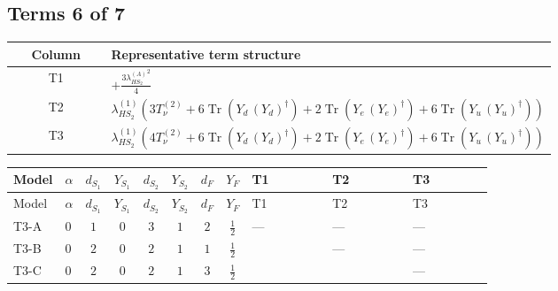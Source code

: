 \documentclass[8pt]{article}
\begin{document}
\begin{landscape}
\subsection*{Terms 6 of 7}
\begin{center}
\begin{tabular}{@{}c >{\raggedright\arraybackslash}p{0.82\linewidth}@{}}
\toprule
Column & Representative term structure \\
\midrule
T1 & \(\displaystyle +\frac{3 {\lambda_{HS_2}^{(A)}}^2}{4}\) \\
\midrule
T2 & \(\displaystyle {\lambda_{HS_2}^{(1)}} (3 T_{\nu}^{(2)}+6 \operatorname{Tr}\!\left({Y_d}\,\left({Y_d}\right)^{\dagger}\right)+2 \operatorname{Tr}\!\left({Y_e}\,\left({Y_e}\right)^{\dagger}\right)+6 \operatorname{Tr}\!\left({Y_u}\,\left({Y_u}\right)^{\dagger}\right))\) \\
\midrule
T3 & \(\displaystyle {\lambda_{HS_2}^{(1)}} (4 T_{\nu}^{(2)}+6 \operatorname{Tr}\!\left({Y_d}\,\left({Y_d}\right)^{\dagger}\right)+2 \operatorname{Tr}\!\left({Y_e}\,\left({Y_e}\right)^{\dagger}\right)+6 \operatorname{Tr}\!\left({Y_u}\,\left({Y_u}\right)^{\dagger}\right))\) \\
\midrule
\bottomrule
\end{tabular}
\end{center}
\smallskip
\tiny
\begin{longtable}{@{}llcccccc >{\raggedright\arraybackslash}p{0.21\linewidth} >{\raggedright\arraybackslash}p{0.21\linewidth} >{\raggedright\arraybackslash}p{0.21\linewidth}@{}}
\toprule
Model & $\alpha$ & $d_{S_1}$ & $Y_{S_1}$ & $d_{S_2}$ & $Y_{S_2}$ & $d_F$ & $Y_F$ & T1 & T2 & T3 \\
\midrule
\endfirsthead
\toprule
Model & $\alpha$ & $d_{S_1}$ & $Y_{S_1}$ & $d_{S_2}$ & $Y_{S_2}$ & $d_F$ & $Y_F$ & T1 & T2 & T3 \\
\midrule
\endhead
T3-A & $0$ & $1$ & $0$ & $3$ & $1$ & $2$ & $\frac{1}{2}$ & --- & --- & --- \\
\midrule
T3-B & $0$ & $2$ & $0$ & $2$ & $1$ & $1$ & $\frac{1}{2}$ & \scriptsize\adjustbox{max width=\linewidth}{$\begin{gathered} +\frac{3 {\lambda_{HS_2}^{(A)}}^2}{4}\end{gathered}$} & --- & --- \\
\midrule
T3-C & $0$ & $2$ & $0$ & $2$ & $1$ & $3$ & $\frac{1}{2}$ & \scriptsize\adjustbox{max width=\linewidth}{$\begin{gathered} +\frac{3 {\lambda_{HS_2}^{(A)}}^2}{4}\end{gathered}$} & \scriptsize\adjustbox{max width=\linewidth}{$\begin{gathered} {\lambda_{HS_2}^{(1)}} (3 T_{\nu}^{(2)}+6 \operatorname{Tr}\!\left({Y_d}\,\left({Y_d}\right)^{\dagger}\right)+2 \operatorname{Tr}\!\left({Y_e}\,\left({Y_e}\right)^{\dagger}\right)+6 \operatorname{Tr}\!\left({Y_u}\,\left({Y_u}\right)^{\dagger}\right))\end{gathered}$} & --- \\

\end{longtable}
\end{landscape}
\end{document}
